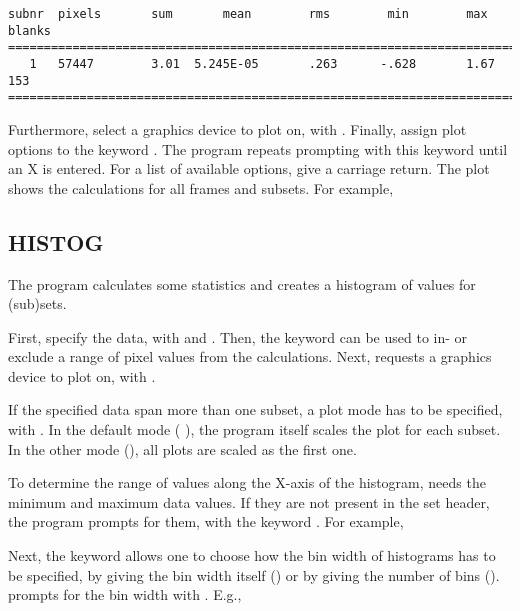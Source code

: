 \begin{verbatim}
subnr  pixels       sum       mean        rms        min        max    blanks
=============================================================================
   1   57447        3.01  5.245E-05       .263      -.628       1.67     153 
=============================================================================
\end{verbatim}


Furthermore, select a graphics device to plot on, with .
Finally, assign plot options to the keyword .  The
program repeats prompting with this keyword until an X is entered.  For
a list of available options, give a carriage return.  The plot shows the
calculations for all frames and subsets.  For example,


\subsection*{HISTOG}

The program  calculates some statistics and creates a
histogram of values for (sub)sets. 

First, specify the data, with  and . 
Then, the keyword  can be used to in- or exclude a range of
pixel values from the calculations.  Next,  requests a
graphics device to plot on, with . 

If the specified data span more than one subset, a plot mode has to be
specified, with .  In the default mode
( ), the program itself scales the
plot for each subset.  In the other mode (),
all plots are scaled as the first one. 
 
To determine the range of values along the X-axis of the histogram,
 needs the minimum and maximum data values.  If they are
not present in the set header, the program prompts for them, with the
keyword .  For example,


Next, the keyword  allows one to choose how the bin
width of histograms has to be specified, by giving the bin width itself
() or by giving the number of bins
().   prompts for the bin
width with .  E.g.,

